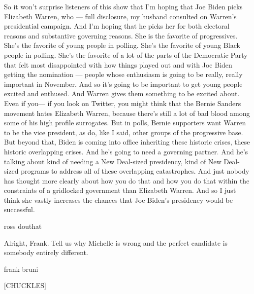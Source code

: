 So it won't surprise listeners of this show that I'm hoping that Joe
Biden picks Elizabeth Warren, who --- full disclosure, my husband
consulted on Warren's presidential campaign. And I'm hoping that he
picks her for both electoral reasons and substantive governing reasons.
She is the favorite of progressives. She's the favorite of young people
in polling. She's the favorite of young Black people in polling. She's
the favorite of a lot of the parts of the Democratic Party that felt
most disappointed with how things played out and with Joe Biden getting
the nomination --- people whose enthusiasm is going to be really, really
important in November. And so it's going to be important to get young
people excited and enthused. And Warren gives them something to be
excited about. Even if you--- if you look on Twitter, you might think
that the Bernie Sanders movement hates Elizabeth Warren, because there's
still a lot of bad blood among some of his high profile surrogates. But
in polls, Bernie supporters want Warren to be the vice president, as do,
like I said, other groups of the progressive base. But beyond that,
Biden is coming into office inheriting these historic crises, these
historic overlapping crises. And he's going to need a governing partner.
And he's talking about kind of needing a New Deal-sized presidency, kind
of New Deal-sized programs to address all of these overlapping
catastrophes. And just nobody has thought more clearly about how you do
that and how you do that within the constraints of a gridlocked
government than Elizabeth Warren. And so I just think she vastly
increases the chances that Joe Biden's presidency would be successful.

ross douthat

Alright, Frank. Tell us why Michelle is wrong and the perfect candidate
is somebody entirely different.

frank bruni

{[}CHUCKLES{]}

